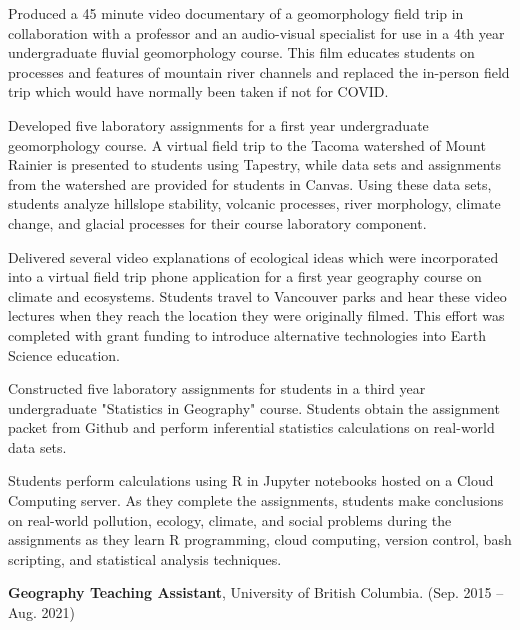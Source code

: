 \documentclass[11pt,letterpaper]{article}
\renewenvironment{itemize}{
	\begin{list}{}{
			\setlength{\leftmargin}{1.5em}
			\setlength{\rightmargin}{0em}  %
			\setlength{\itemsep}{0.25em}
			\setlength{\parskip}{0pt}
			\setlength{\parsep}{0.25em}
		}
	}{
	\end{list}
}
\newenvironment{itemizeit}
{\itemize\let\origitem\item
	\renewcommand{\item}[1][default]
	{\origitem[\tiny $\blacksquare$]}}
{\enditemize}
\renewenvironment{itemize}{
	\begin{list}{}{
			\setlength{\leftmargin}{1.5em}
			\setlength{\itemsep}{0.25em}
			\setlength{\parskip}{0pt}
			\setlength{\parsep}{0.25em}
		}
	}{
	\end{list}
}
\begin{document}
\begin{itemize}
	\begin{itemizeit} 
		\item Produced a 45 minute video documentary of a geomorphology field trip in collaboration with a professor and an audio-visual specialist for use in a 4th year undergraduate fluvial geomorphology course. This film educates students on processes and features of mountain river channels and replaced the in-person field trip which would have normally been taken if not for COVID.
		\item Developed five laboratory assignments for a first year undergraduate geomorphology course. A virtual field trip to the Tacoma watershed of Mount Rainier is presented to students using Tapestry, while data sets and assignments from the watershed are provided for students in Canvas. Using these data sets, students analyze hillslope stability, volcanic processes, river morphology, climate change, and glacial processes for their course laboratory component.
		\item Delivered several video explanations of ecological ideas which were incorporated into a virtual field trip phone application for a first year geography course on climate and ecosystems. Students travel to Vancouver parks and hear these video lectures when they reach the location they were originally filmed. This effort was completed with grant funding to introduce alternative technologies into Earth Science education.
		\item Constructed five laboratory assignments for students in a third year undergraduate "Statistics in Geography" course. Students obtain the assignment packet from Github and perform inferential statistics calculations on real-world data sets.
		\item Students perform calculations using R in Jupyter notebooks hosted on a Cloud Computing server.  As they complete the assignments, students make conclusions on real-world pollution, ecology, climate, and social problems during the assignments as they learn R programming, cloud computing, version control, bash scripting, and statistical analysis techniques.
	\end{itemizeit}

\item {\bf Geography Teaching Assistant}, University of British Columbia. \hfill (Sep. 2015 -- Aug. 2021)


\end{itemize}
\end{document}
